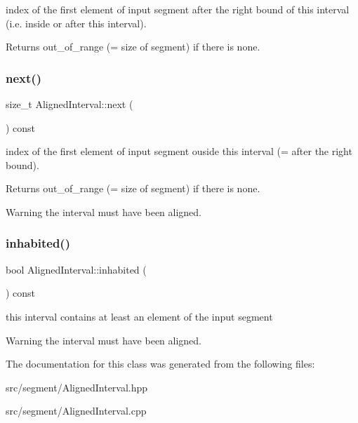 index of the first element of input segment after the right bound of this interval (i.\+e. inside or after this interval). 

\begin{DoxyReturn}{Returns}
out\+\_\+of\+\_\+range (= size of segment) if there is none. 
\end{DoxyReturn}
\mbox{\label{classAlignedInterval_ac9617c302c66993c1f84c757f2c71d16}} 
\subsubsection{\texorpdfstring{next()}{next()}}
{\footnotesize\ttfamily size\+\_\+t Aligned\+Interval\+::next (\begin{DoxyParamCaption}{ }\end{DoxyParamCaption}) const\hspace{0.3cm}{\ttfamily [inline]}}



index of the first element of input segment ouside this interval (= after the right bound). 

\begin{DoxyReturn}{Returns}
out\+\_\+of\+\_\+range (= size of segment) if there is none. 
\end{DoxyReturn}
\begin{DoxyWarning}{Warning}
the interval must have been aligned. 
\end{DoxyWarning}
\mbox{\label{classAlignedInterval_adefeebb5ddd10a68e83ed7382626d380}} 
\subsubsection{\texorpdfstring{inhabited()}{inhabited()}}
{\footnotesize\ttfamily bool Aligned\+Interval\+::inhabited (\begin{DoxyParamCaption}{ }\end{DoxyParamCaption}) const\hspace{0.3cm}{\ttfamily [inline]}}



this interval contains at least an element of the input segment 

\begin{DoxyWarning}{Warning}
the interval must have been aligned. 
\end{DoxyWarning}


The documentation for this class was generated from the following files\+:\begin{DoxyCompactItemize}
\item 
src/segment/Aligned\+Interval.\+hpp\item 
src/segment/Aligned\+Interval.\+cpp\end{DoxyCompactItemize}
